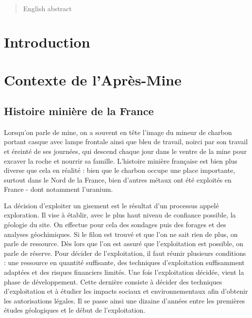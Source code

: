 \documentclass{article}
\begin{document}
{
\begin{abstract}
    English abstract
\end{abstract}
}

\newpage
{}
\section*{Introduction}

\newpage
\section{Contexte de l’Après-Mine}

\subsection{Histoire minière de la France}

\paragraph{} Lorsqu’on parle de mine, on a souvent en tête l’image du mineur de charbon portant casque avec lampe frontale ainsi que bleu de travail, noirci par son travail et éreinté de ses journées, qui descend chaque jour dans le ventre de la mine pour excaver la roche et nourrir sa famille. L’histoire minière française est bien plus diverse que cela en réalité : bien que le charbon occupe une place importante, surtout dans le Nord de la France, bien d’autres métaux ont été exploités en France - dont notamment l’uranium.

La décision d’exploiter un gisement est le résultat d’un processus appelé exploration. Il vise à établir, avec le plus haut niveau de confiance possible, la géologie du site. On effectue pour cela des sondages puis des forages et des analyses géochimiques. Si le filon est trouvé et que l’on ne sait rien de plus, on parle de ressource. Dès lors que l’on est assuré que l’exploitation est possible, on parle de réserve. Pour décider de l’exploitation, il faut réunir plusieurs conditions : une ressource en quantité suffisante, des techniques d’exploitation suffisamment adaptées et des risques financiers limités. Une fois l’exploitation décidée, vient la phase de développement. Cette dernière consiste à décider des techniques d’exploitation et à étudier les impacts sociaux et environnementaux afin d’obtenir les autorisations légales. Il se passe ainsi une dizaine d’années entre les premières études géologiques et le début de l’exploitation. 
\end{document}
